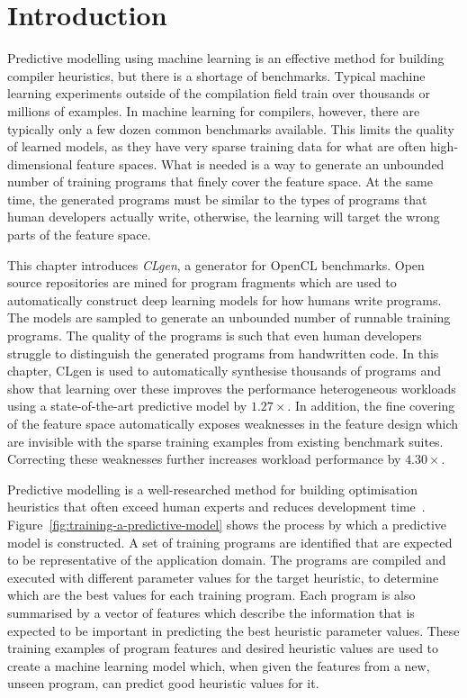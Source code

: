 \section{Introduction}

Predictive modelling using machine learning is an effective method for building compiler heuristics, but there is a shortage of benchmarks. Typical machine learning experiments outside of the compilation field train over thousands or millions of examples. In machine learning for compilers, however, there are typically only a few dozen common benchmarks available. This limits the quality of learned models, as they have very sparse training data for what are often high-dimensional feature spaces. What is needed is a way to generate an unbounded number of training programs that finely cover the feature space. At the same time, the generated programs must be similar to the types of programs that human developers actually write, otherwise, the learning will target the wrong parts of the feature space.

This chapter introduces \emph{CLgen}, a generator for OpenCL benchmarks. Open source repositories are mined for program fragments which are used to automatically construct deep learning models for how humans write programs. The models are sampled to generate an unbounded number of runnable training programs. The quality of the programs is such that even human developers struggle to distinguish the generated programs from handwritten code. In this chapter, CLgen is used to automatically synthesise thousands of programs and show that learning over these improves the performance heterogeneous workloads using a state-of-the-art predictive model by $1.27\times$. In addition, the fine covering of the feature space automatically exposes weaknesses in the feature design which are invisible with the sparse training examples from existing benchmark suites. Correcting these weaknesses further increases workload performance by $4.30\times$.

Predictive modelling is a well-researched method for building optimisation heuristics that often exceed human experts and reduces development time~\cite{Micolet2016,Wang2014c,Magni2014,Cummins2016,Wang2009,Wen2015,Wang2010,Falch2015,Collins2012,Leather2014,Ogilvie2014a}. Figure~\ref{fig:training-a-predictive-model} shows the process by which a predictive model is constructed. A set of training programs are identified that are expected to be representative of the application domain. The programs are compiled and executed with different parameter values for the target heuristic, to determine which are the best values for each training program. Each program is also summarised by a vector of features which describe the information that is expected to be important in predicting the best heuristic parameter values. These training examples of program features and desired heuristic values are used to create a machine learning model which, when given the features from a new, unseen program, can predict good heuristic values for it.

